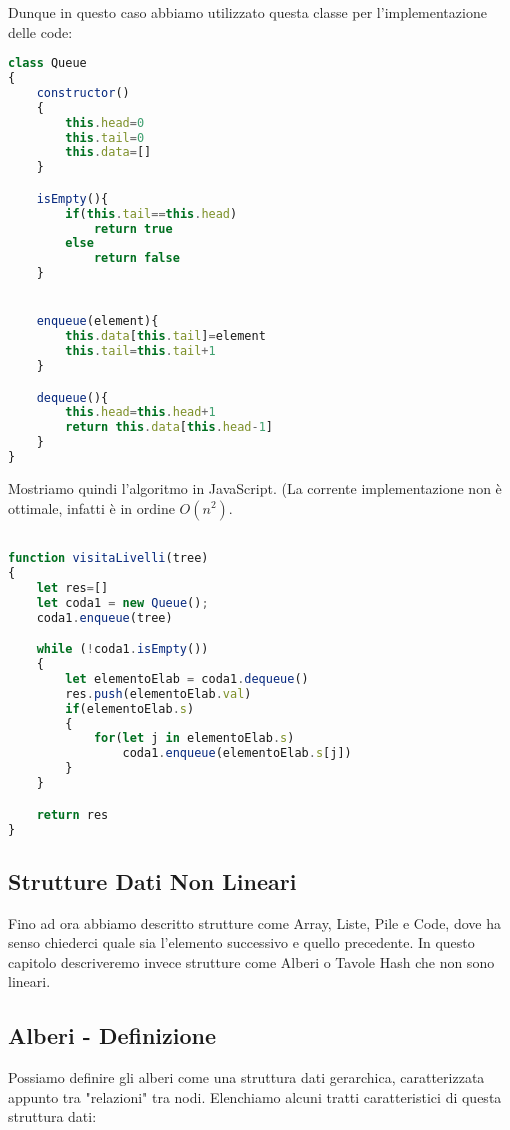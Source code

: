 \documentclass{article}
\begin{document}
Dunque in questo caso abbiamo utilizzato questa classe per l'implementazione delle code:

\begin{lstlisting}[language=JavaScript]
    class Queue
{
    constructor()
    {
        this.head=0
        this.tail=0
        this.data=[]
    }

    isEmpty(){
        if(this.tail==this.head)
            return true
        else
            return false
    }


    enqueue(element){
        this.data[this.tail]=element
        this.tail=this.tail+1
    }

    dequeue(){
        this.head=this.head+1
        return this.data[this.head-1]
    }
}
\end{lstlisting}

Mostriamo quindi l'algoritmo in JavaScript. (La corrente implementazione non è ottimale, infatti è in ordine \(O(n^2)\).

\newpage

\begin{lstlisting}[language=JavaScript]

function visitaLivelli(tree)
{
    let res=[]
    let coda1 = new Queue();
    coda1.enqueue(tree)

    while (!coda1.isEmpty())
    {
        let elementoElab = coda1.dequeue()
        res.push(elementoElab.val)
        if(elementoElab.s)
        {
            for(let j in elementoElab.s)
                coda1.enqueue(elementoElab.s[j])
        }
    }

    return res
}

\end{lstlisting}

\subsection{Strutture Dati Non Lineari}

Fino ad ora abbiamo descritto strutture come Array, Liste, Pile e Code, dove ha senso chiederci quale sia l'elemento successivo e quello precedente. In questo capitolo descriveremo invece strutture come Alberi o Tavole Hash che non sono lineari.

\subsection{Alberi - Definizione} Possiamo definire gli alberi come una struttura dati gerarchica, caratterizzata appunto tra "relazioni" tra nodi. Elenchiamo alcuni tratti caratteristici di questa struttura dati:
\end{document}
